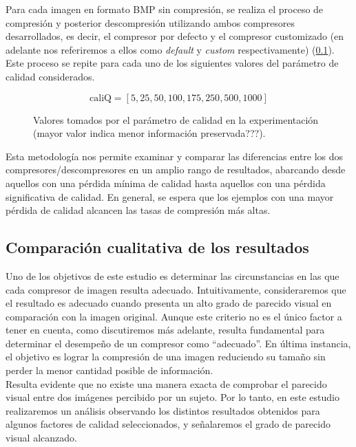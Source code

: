 \documentclass[12pt,a4paper]{article}
\begin{document}
Para cada imagen en formato BMP sin compresión, se realiza el proceso de compresión y posterior descompresión utilizando ambos compresores desarrollados, es decir, el compresor por defecto y el compresor customizado (en adelante nos referiremos a ellos como \textit{default} y \textit{custom} respectivamente) (\ref{}). Este proceso se repite para cada uno de los siguientes valores del parámetro de calidad considerados.\\
\begin{figure}[H]
    \centering
\[
\text{caliQ} = [5,25,50,100,175,250,500,1000]
\]
    \caption{Valores tomados por el parámetro de calidad en la experimentación (mayor valor indica menor información preservada???).}
    
\end{figure}

Esta metodología nos permite examinar y comparar las diferencias entre los dos compresores/descompresores en un amplio rango de resultados, abarcando desde aquellos con una pérdida mínima de calidad hasta aquellos con una pérdida significativa de calidad. En general, se espera que los ejemplos con una mayor pérdida de calidad alcancen las tasas de compresión más altas.\\

\subsection{Comparación cualitativa de los resultados}
Uno de los objetivos de este estudio es determinar las circunstancias en las que cada compresor de imagen resulta adecuado. Intuitivamente, consideraremos que el resultado es adecuado cuando presenta un alto grado de parecido visual en comparación con la imagen original. Aunque este criterio no es el único factor a tener en cuenta, como discutiremos más adelante, resulta fundamental para determinar el desempeño de un compresor como ``adecuado''. En última instancia, el objetivo es lograr la compresión de una imagen reduciendo su tamaño sin perder la menor cantidad posible de información.\\

Resulta evidente que no existe una manera exacta de comprobar el parecido visual entre dos imágenes percibido por un sujeto. Por lo tanto, en este estudio realizaremos un análisis observando los distintos resultados obtenidos para algunos factores de calidad seleccionados, y señalaremos el grado de parecido visual alcanzado.\\
\end{document}
